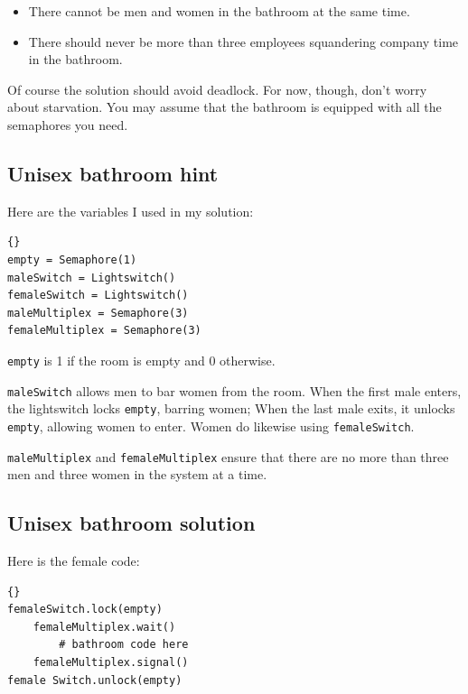 \documentclass{book}
\newcommand{\clearemptydoublepage}{\newpage\cleardoublepage}
\begin{document}
\begin {itemize}

\item There cannot be men and women in the bathroom
at the same time.

\item There should never be more than three
employees squandering company time in the bathroom.

\end{itemize}

Of course the solution should avoid deadlock.  For now, though, don't
worry about starvation.  You may assume that the bathroom is equipped
with all the semaphores you need.


\clearemptydoublepage
\subsection {Unisex bathroom hint}

Here are the variables I used in my solution:

\begin{latin}
\begin{latin}
\begin{lstlisting}[title={Unisex bathroom hint}]{}
empty = Semaphore(1)
maleSwitch = Lightswitch()
femaleSwitch = Lightswitch()
maleMultiplex = Semaphore(3)
femaleMultiplex = Semaphore(3)
\end{lstlisting}
\end{latin}
\end{latin}

{\tt empty} is 1 if the room is empty and 0 otherwise.

{\tt maleSwitch} allows men to bar women from the room.
When the first male enters, the lightswitch locks {\tt empty}, barring women;
When the last male exits, it unlocks {\tt empty}, allowing women
to enter.  Women do likewise using {\tt femaleSwitch}.

{\tt maleMultiplex} and {\tt femaleMultiplex} ensure that there are no
more than three men and three women in the system at a time.


\clearemptydoublepage
\subsection {Unisex bathroom solution}

Here is the female code:

\begin{latin}
\begin{lstlisting}[title={Unisex bathroom solution (female)}]{}
femaleSwitch.lock(empty)
    femaleMultiplex.wait()
        # bathroom code here
    femaleMultiplex.signal()
female Switch.unlock(empty)
\end{lstlisting}
\end{latin}
\end{document}
